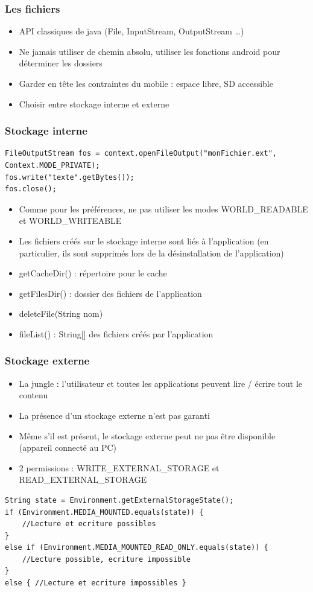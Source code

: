 \documentclass{beamer}
\begin{document}
\begin{frame}[fragile]
\frametitle{Les fichiers}
\begin{itemize}
    \item API classiques de java (File, InputStream, OutputStream \ldots)
    \item Ne jamais utiliser de chemin absolu, utiliser les fonctions android pour déterminer les dossiers
    \item Garder en tête les contraintes du mobile : espace libre, SD accessible
    \item Choisir entre stockage interne et externe
\end{itemize}
\end{frame}
\begin{frame}[fragile]
\frametitle{Stockage interne}
\begin{lstlisting}
FileOutputStream fos = context.openFileOutput("monFichier.ext", Context.MODE_PRIVATE);
fos.write("texte".getBytes());
fos.close();
\end{lstlisting}
\begin{itemize}
    \item Comme pour les préférences, ne pas utiliser les modes WORLD\_READABLE et WORLD\_WRITEABLE
    \item Les fichiers créés sur le stockage interne sont liés à l'application
    (en particulier, ils sont supprimés lors de la désinstallation de l'application)
\end{itemize}
\begin{itemize}
    \item getCacheDir() : répertoire pour le cache
    \item getFilesDir() : dossier des fichiers de l'application
    \item deleteFile(String nom)
    \item fileList() : String[] des fichiers créés par l'application
\end{itemize}
\end{frame}
\begin{frame}[fragile]
\frametitle{Stockage externe}
\begin{itemize}
    \item La jungle : l'utilisateur et toutes les applications peuvent lire / écrire tout le contenu
    \item La présence d'un stockage externe n'est pas garanti
    \item Même s'il est présent, le stockage externe peut ne pas être
    disponible (appareil connecté au PC)
    \item 2 permissions : WRITE\_EXTERNAL\_STORAGE et READ\_EXTERNAL\_STORAGE
\end{itemize}
\begin{lstlisting}
String state = Environment.getExternalStorageState();
if (Environment.MEDIA_MOUNTED.equals(state)) {
    //Lecture et ecriture possibles
} 
else if (Environment.MEDIA_MOUNTED_READ_ONLY.equals(state)) {
    //Lecture possible, ecriture impossible
} 
else { //Lecture et ecriture impossibles }
\end{lstlisting}
\end{frame}
\end{document}
